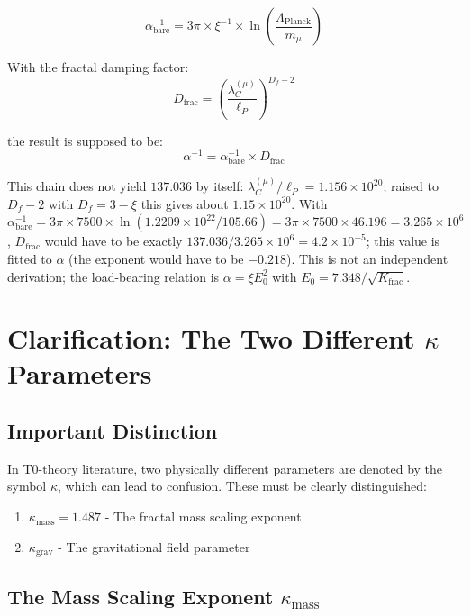 	\begin{equation}
		\alpha_{\text{bare}}^{-1} = 3\pi \times \xi^{-1} \times \ln\left(\frac{\Lambda_{\text{Planck}}}{m_\mu}\right)
	\end{equation}
	
	With the fractal damping factor:
	\begin{equation}
		D_{\text{frac}} = \left(\frac{\lambda_C^{(\mu)}}{\ell_P}\right)^{D_f-2}
	\end{equation}
	
	the result is supposed to be:
	\begin{equation}
		\alpha^{-1} = \alpha_{\text{bare}}^{-1} \times D_{\text{frac}}
	\end{equation}
	
	This chain does not yield $137.036$ by itself: $\lambda_C^{(\mu)}/\ell_P = 1.156 \times 10^{20}$; raised to $D_f - 2$ with $D_f = 3 - \xi$ this gives about $1.15 \times 10^{20}$. With $\alpha_{\text{bare}}^{-1} = 3\pi \times 7500 \times \ln(1.2209 \times 10^{22}/105.66) = 3\pi \times 7500 \times 46.196 = 3.265 \times 10^{6}$, $D_{\text{frac}}$ would have to be exactly $137.036/3.265 \times 10^{6} = 4.2 \times 10^{-5}$; this value is fitted to $\alpha$ (the exponent would have to be $-0.218$). This is not an independent derivation; the load-bearing relation is $\alpha = \xi E_0^2$ with $E_0 = 7.348/\sqrt{K_{\text{frac}}}$.
	
	\section{Clarification: The Two Different $\kappa$ Parameters}
	
	\subsection{Important Distinction}
	
	In T0-theory literature, two physically different parameters are denoted by the symbol $\kappa$, which can lead to confusion. These must be clearly distinguished:
	
	\begin{enumerate}
		\item $\kappa_{\text{mass}} = 1.487$ - The fractal mass scaling exponent
		\item $\kappa_{\text{grav}}$ - The gravitational field parameter
	\end{enumerate}
	
	\subsection{The Mass Scaling Exponent $\kappa_{\text{mass}}$}
	
